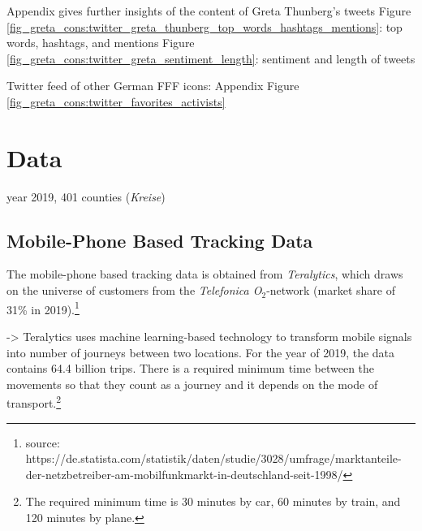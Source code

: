 \restoregeometry








Appendix gives further insights of the content of Greta Thunberg's tweets
Figure \ref{fig_greta_cons:twitter_greta_thunberg_top_words_hashtags_mentions}: top words, hashtags, and mentions
Figure \ref{fig_greta_cons:twitter_greta_sentiment_length}: sentiment and length of tweets


Twitter feed of other German FFF icons: Appendix Figure \ref{fig_greta_cons:twitter_favorites_activists}
















\newpage
\section{Data}\label{sec_greta_cons:data} 

year 2019, 401 counties (\textit{Kreise})



\subsection{Mobile-Phone Based Tracking Data}

The mobile-phone based tracking data is obtained from \textit{Teralytics}, which draws on the universe of customers from the \textit{Telefonica O$_2$}-network (market share of 31\% in 2019).\footnote{source: https://de.statista.com/statistik/daten/studie/3028/umfrage/marktanteile-der-netzbetreiber-am-mobilfunkmarkt-in-deutschland-seit-1998/} 

->
Teralytics uses machine learning-based technology to transform mobile signals into number of journeys between two locations. For the year of 2019, the data contains 64.4 billion trips. There is a required minimum time between the movements so that they count as a journey and it depends on the mode of transport.\footnote{The required minimum time is 30 minutes by car, 60 minutes by train, and 120 minutes by plane.} 


